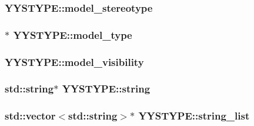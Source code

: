 \subsubsection[{model\+\_\+stereotype}]{ Y\+Y\+S\+T\+Y\+P\+E\+::model\+\_\+stereotype}\label{unionYYSTYPE_af24face112bb5754e94b4fd2b0c666c1}
\hypertarget{unionYYSTYPE_a2262e4fdf23475305af071cf2dce24f3}{}
\subsubsection[{model\+\_\+type}]{$\ast$ Y\+Y\+S\+T\+Y\+P\+E\+::model\+\_\+type}\label{unionYYSTYPE_a2262e4fdf23475305af071cf2dce24f3}
\hypertarget{unionYYSTYPE_ab17b1393dae8de54663649a094da13ed}{}
\subsubsection[{model\+\_\+visibility}]{ Y\+Y\+S\+T\+Y\+P\+E\+::model\+\_\+visibility}\label{unionYYSTYPE_ab17b1393dae8de54663649a094da13ed}
\hypertarget{unionYYSTYPE_a4bd606f3c9cec57ee4ba48957509b3f8}{}
\subsubsection[{string}]{\setlength{\rightskip}{0pt plus 5cm}std\+::string$\ast$ Y\+Y\+S\+T\+Y\+P\+E\+::string}\label{unionYYSTYPE_a4bd606f3c9cec57ee4ba48957509b3f8}
\hypertarget{unionYYSTYPE_aca50ce01e3307959b0acf7740f490170}{}
\subsubsection[{string\+\_\+list}]{\setlength{\rightskip}{0pt plus 5cm}std\+::vector$<$std\+::string$>$$\ast$ Y\+Y\+S\+T\+Y\+P\+E\+::string\+\_\+list}\label{unionYYSTYPE_aca50ce01e3307959b0acf7740f490170}
\hypertarget{unionYYSTYPE_a01b79e2c4a8e5ec028cca4892559e802}{}
